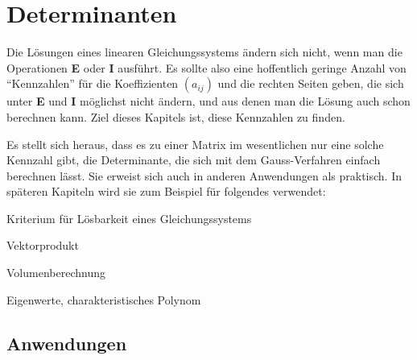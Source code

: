 %
%
%
\chapter{Determinanten\label{chapter-determinanten}}
\rhead{}
Die Lösungen eines linearen Gleichungssystems ändern sich nicht,
wenn man die Operationen {\bf E} oder {\bf I} ausführt.
Es sollte
also eine hoffentlich geringe Anzahl von ``Kennzahlen'' für die
Koeffizienten $(a_{ij})$
und die rechten Seiten geben, die sich unter {\bf E} und {\bf I}
möglichst nicht ändern, und aus denen man die Lösung auch
schon berechnen kann.
Ziel dieses Kapitels ist, diese Kennzahlen zu finden.

Es stellt sich heraus, dass es zu einer Matrix
im wesentlichen nur eine solche Kennzahl gibt, die Determinante,
die sich mit dem Gauss-Verfahren einfach berechnen lässt.
Sie erweist sich auch in anderen Anwendungen als praktisch.
In späteren Kapiteln
wird sie zum Beispiel für folgendes verwendet:
\begin{compactitem}
\item Kriterium für Lösbarkeit eines Gleichungssystems
\item Vektorprodukt
\item Volumenberechnung
\item Eigenwerte, charakteristisches Polynom
\end{compactitem}









\section{Anwendungen}


